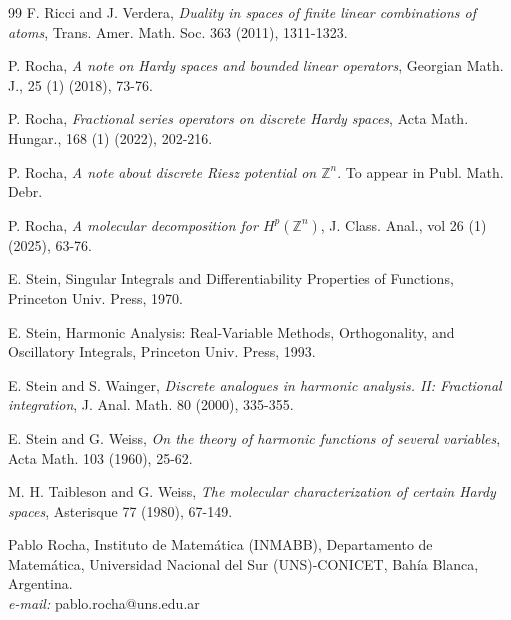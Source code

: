 \documentclass[leqno,12pt]{article} %
\theoremstyle{plain} %
\theoremstyle{definition} %
\begin{document}
\begin{thebibliography}{99}
 F. Ricci and J. Verdera, {\it Duality in spaces of finite linear combinations of atoms}, Trans. Amer. Math. Soc. 363 
(2011), 1311-1323.

 P. Rocha, {\it A note on Hardy spaces and bounded linear operators}, Georgian Math. J., 25 (1) (2018), 73-76.

 P. Rocha, {\it Fractional series operators on discrete Hardy spaces}, Acta Math. Hungar., 168 (1) (2022), 202-216.

 P. Rocha, {\it A note about discrete Riesz potential on $\mathbb{Z}^n$}. To appear in Publ. Math. Debr.

 P. Rocha, {\it A molecular decomposition for $H^p(\mathbb{Z}^n)$}, J. Class. Anal., vol 26 (1) (2025), 63-76.

 E. Stein, Singular Integrals and Differentiability Properties of Functions, Princeton Univ. Press, 1970.

 E. Stein, Harmonic Analysis: Real-Variable Methods, Orthogonality, and Oscillatory Integrals, Princeton Univ. Press,
1993.

 E. Stein and S. Wainger, {\it Discrete analogues in harmonic analysis. II: Fractional integration}, J. Anal. Math. 80 
(2000), 335-355.

 E. Stein and G. Weiss, {\it On the theory of harmonic functions of several variables}, Acta Math. 103 (1960), 25-62.

 M. H. Taibleson and G. Weiss, {\it The molecular characterization of certain Hardy spaces}, Asterisque 77 (1980), 67-149.


\end{thebibliography}

Pablo Rocha, Instituto de Matem\'atica (INMABB), Departamento de Matem\'atica, Universidad Nacional del Sur (UNS)-CONICET, Bah\'ia Blanca, Argentina. \\
{\it e-mail:} pablo.rocha@uns.edu.ar
\end{document}
